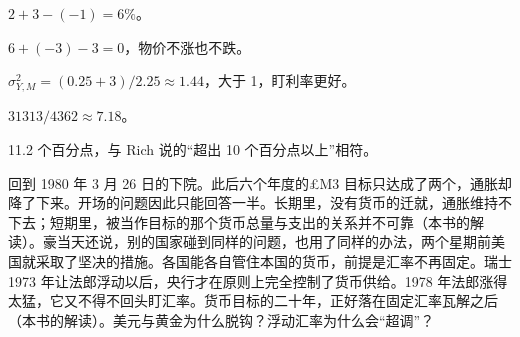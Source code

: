 \begin{answers}
\item $2+3-(-1)=6\%$。
\item $6+(-3)-3=0$，物价不涨也不跌。
\item $\sigma^{2}_{Y,M}=(0.25+3)/2.25\approx1.44$，大于 1，盯利率更好。
\item $31313/4362\approx7.18$。
\item 11.2 个百分点，与 Rich 说的“超出 10 个百分点以上”相符。
\end{answers}

回到 1980 年 3 月 26 日的下院。此后六个年度的£M3 目标只达成了两个，通胀却降了下来\cite{leighpemberton1986}。开场的问题因此只能回答一半。长期里，没有货币的迁就，通胀维持不下去；短期里，被当作目标的那个货币总量与支出的关系并不可靠（本书的解读）。豪当天还说，别的国家碰到同样的问题，也用了同样的办法，两个星期前美国就采取了坚决的措施\cite{hansard1980}。各国能各自管住本国的货币，前提是汇率不再固定。瑞士 1973 年让法郎浮动以后，央行才在原则上完全控制了货币供给\cite{rich2003}。1978 年法郎涨得太猛，它又不得不回头盯汇率\cite{rich2003}。货币目标的二十年，正好落在固定汇率瓦解之后（本书的解读）。美元与黄金为什么脱钩？浮动汇率为什么会“超调”？
